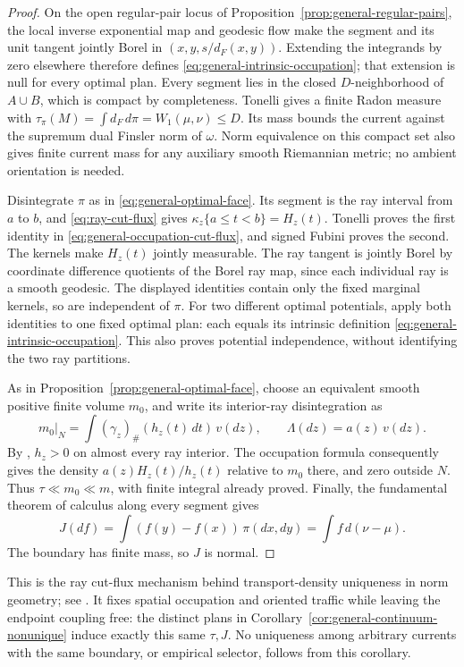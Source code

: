 \documentclass[11pt,reqno]{amsart}
\theoremstyle{definition}
\theoremstyle{remark}
\numberwithin{equation}{section}
\begin{document}
\begin{proof}
On the open regular-pair locus of
Proposition~\ref{prop:general-regular-pairs}, the local inverse exponential
map and geodesic flow make the segment and its unit tangent jointly
Borel in \((x,y,s/d_F(x,y))\). Extending the integrands by zero elsewhere
therefore defines \eqref{eq:general-intrinsic-occupation}; that extension
is null for every optimal plan. Every segment lies in the closed
\(D\)-neighborhood of \(A\cup B\), which is compact by completeness.
Tonelli gives a finite Radon measure with
\(\tau_\pi(M)=\int d_F\,d\pi=W_1(\mu,\nu)\le D\).
Its mass bounds the current against the supremum dual Finsler norm of
\(\omega\). Norm equivalence on this compact set also gives finite
current mass for any auxiliary smooth Riemannian metric; no ambient
orientation is needed.

Disintegrate \(\pi\) as in \eqref{eq:general-optimal-face}.
Its segment is the ray interval from \(a\) to \(b\), and
\eqref{eq:ray-cut-flux} gives
\(\kappa_z\{a\le t<b\}=H_z(t)\).
Tonelli proves the first identity in
\eqref{eq:general-occupation-cut-flux}, and signed Fubini proves the
second. The kernels make \(H_z(t)\) jointly measurable. The ray tangent
is jointly Borel by coordinate difference quotients of the Borel ray
map, since each individual ray is a smooth geodesic. The displayed
identities contain only the fixed marginal kernels, so are independent
of \(\pi\). For two different optimal potentials, apply both identities
to one fixed optimal plan: each equals its intrinsic definition
\eqref{eq:general-intrinsic-occupation}. This also proves potential
independence, without identifying the two ray partitions.

As in Proposition~\ref{prop:general-optimal-face}, choose an equivalent
smooth positive finite volume \(m_0\), and write its interior-ray
disintegration as
\[
 m_0|_N=\int(\gamma_z)_\#(h_z(t)\,dt)\,v(dz),\qquad
 \Lambda(dz)=a(z)\,v(dz).
\]
By \cite[Proposition~6.4(i),(iii)]{OhtaNeedles}, \(h_z>0\) on
almost every ray interior. The occupation formula consequently gives
the density \(a(z)H_z(t)/h_z(t)\) relative to \(m_0\) there,
and zero outside \(N\). Thus \(\tau\ll m_0\ll m\), with finite
integral already proved. Finally, the fundamental theorem of calculus
along every segment gives
\[
 J(df)=\int(f(y)-f(x))\,\pi(dx,dy)=\int f\,d(\nu-\mu).
\]
The boundary has finite mass, so \(J\) is normal.
\end{proof}

This is the ray cut-flux mechanism behind transport-density uniqueness
in norm geometry; see \cite[Section~4 and Theorem~4.1]{FeldmanMcCannDensity}.
It fixes spatial occupation and oriented traffic while leaving the
endpoint coupling free: the distinct plans in
Corollary~\ref{cor:general-continuum-nonunique} induce exactly this same
\(\tau,J\). No uniqueness among arbitrary currents with the same
boundary, or empirical selector, follows from this corollary.
\end{document}
